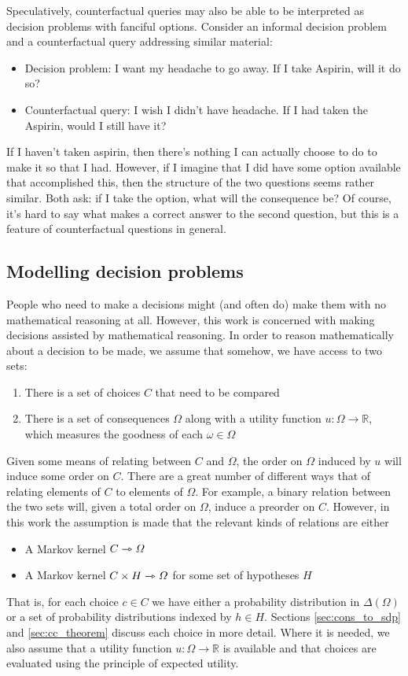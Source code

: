 Speculatively, counterfactual queries may also be able to be interpreted as decision problems with fanciful options. Consider an informal decision problem and a counterfactual query addressing similar material:
\begin{itemize}
    \item Decision problem: I want my headache to go away. If I take Aspirin, will it do so?
    \item Counterfactual query: I wish I didn't have headache. If I had taken the Aspirin, would I still have it?
\end{itemize}
If I haven't taken aspirin, then there's nothing I can actually choose to do to make it so that I had. However, if I imagine that I did have some option available that accomplished this, then the structure of the two questions seems rather similar. Both ask: if I take the option, what will the consequence be? Of course, it's hard to say what makes a correct answer to the second question, but this is a feature of counterfactual questions in general.

\subsection{Modelling decision problems}\label{sec:modelling_decision_problems}

People who need to make a decisions might (and often do) make them with no mathematical reasoning at all. However, this work is concerned with making decisions assisted by mathematical reasoning. In order to reason mathematically about a decision to be made, we assume that somehow, we have access to two sets:
\begin{enumerate}
    \item There is a set of choices $C$ that need to be compared
    \item There is a set of consequences $\Omega$ along with a utility function $u:\Omega\to \mathbb{R}$, which measures the goodness of each $\omega\in \Omega$
\end{enumerate}

Given some means of relating between $C$ and $\Omega$, the order on $\Omega$ induced by $u$ will induce some order on $C$. There are a great number of different ways that of relating elements of $C$ to elements of $\Omega$. For example, a binary relation between the two sets will, given a total order on $\Omega$, induce a preorder on $C$. However, in this work the assumption is made that the relevant kinds of relations are either
\begin{itemize}
    \item A Markov kernel $C\rightarrowtriangle \Omega$
    \item A Markov kernel $C\times H\rightarrowtriangle \Omega$ for some set of hypotheses $H$
\end{itemize}
That is, for each choice $c\in C$ we have either a probability distribution in $\Delta(\Omega)$ or a set of probability distributions indexed by $h\in H$. Sections \ref{sec:cons_to_sdp} and \ref{sec:cc_theorem} discuss each choice in more detail. Where it is needed, we also assume that a utility function $u:\Omega\to \mathbb{R}$ is available and that choices are evaluated using the principle of expected utility.

